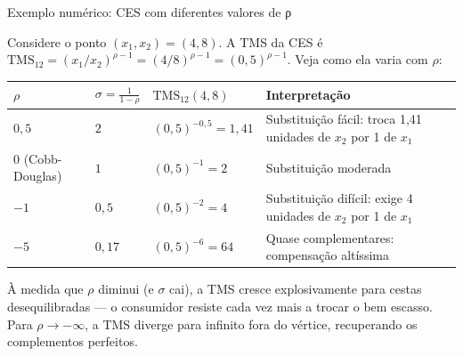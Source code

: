 \documentclass[11pt,twoside,openright]{book}
\begin{document}
\begin{examplebox}{Exemplo numérico: CES com diferentes valores de ρ}

Considere o ponto \((x_1, x_2) = (4, 8)\). A TMS da CES é
\(\text{TMS}_{12} = (x_1/x_2)^{\rho-1} = (4/8)^{\rho-1} = (0{,}5)^{\rho-1}\).
Veja como ela varia com \(\rho\):

{\def\LTcaptype{none} %
\begin{longtable}[]{@{}
  >{\raggedright\arraybackslash}p{}
  >{\raggedright\arraybackslash}p{}
  >{\raggedright\arraybackslash}p{}
  >{\raggedright\arraybackslash}p{}@{}}
\toprule\noalign{}
\begin{minipage}[b]{\linewidth}\raggedright
\(\rho\)
\end{minipage} & \begin{minipage}[b]{\linewidth}\raggedright
\(\sigma = \frac{1}{1-\rho}\)
\end{minipage} & \begin{minipage}[b]{\linewidth}\raggedright
\(\text{TMS}_{12}(4,8)\)
\end{minipage} & \begin{minipage}[b]{\linewidth}\raggedright
Interpretação
\end{minipage} \\
\midrule\noalign{}
\endhead
\bottomrule\noalign{}
\endlastfoot
\(0{,}5\) & \(2\) & \((0{,}5)^{-0,5} = 1{,}41\) & Substituição fácil:
troca 1,41 unidades de \(x_2\) por 1 de \(x_1\) \\
\(0\) (Cobb-Douglas) & \(1\) & \((0{,}5)^{-1} = 2\) & Substituição
moderada \\
\(-1\) & \(0{,}5\) & \((0{,}5)^{-2} = 4\) & Substituição difícil: exige
4 unidades de \(x_2\) por 1 de \(x_1\) \\
\(-5\) & \(0{,}17\) & \((0{,}5)^{-6} = 64\) & Quase complementares:
compensação altíssima \\
\end{longtable}
}

À medida que \(\rho\) diminui (e \(\sigma\) cai), a TMS cresce
explosivamente para cestas desequilibradas --- o consumidor resiste cada
vez mais a trocar o bem escasso. Para \(\rho \to -\infty\), a TMS
diverge para infinito fora do vértice, recuperando os complementos
perfeitos.

\end{examplebox}
\end{document}
